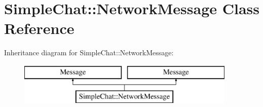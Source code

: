 \hypertarget{classSimpleChat_1_1NetworkMessage}{\section{Simple\-Chat\-:\-:Network\-Message Class Reference}
\label{classSimpleChat_1_1NetworkMessage}
}
Inheritance diagram for Simple\-Chat\-:\-:Network\-Message\-:\begin{figure}[H]
\begin{center}
\leavevmode
\includegraphics[height=2.000000cm]{classSimpleChat_1_1NetworkMessage}
\end{center}
\end{figure}
